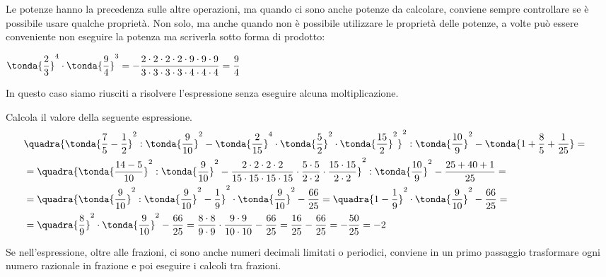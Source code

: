 Le potenze hanno la precedenza sulle altre operazioni, ma quando ci sono 
anche potenze da calcolare, conviene sempre controllare se è possibile usare 
qualche proprietà. Non solo, ma anche quando non è possibile utilizzare le 
proprietà delle potenze, a volte può essere conveniente non eseguire la 
potenza ma scriverla sotto forma di prodotto:

\begin{esempio}{}{}
\(\tonda{\dfrac{2}{3}}^4 \cdot \tonda{\dfrac{9}{4}}^3  = 
-\dfrac{2 \cdot 2 \cdot 2 \cdot 2 \cdot 9 \cdot 9 \cdot 9}
      {3 \cdot 3 \cdot 3 \cdot 3 \cdot 4 \cdot 4 \cdot 4} = \dfrac{9}{4}\)
\end{esempio}

In questo caso siamo riusciti a risolvere l'espressione senza eseguire
alcuna moltiplicazione.


\begin{esempio}{}{}
Calcola il valore della seguente espressione.
{\footnotesize
\begin{align*}
&\quadra{
  \tonda{\frac{7}{5}-\frac{1}{2}}^{2}:
  \tonda{\frac{9}{10}}^{2}-
  \tonda{\frac{2}{15}}^{4} \cdot
  \tonda{\frac{5}{2}}^2 \cdot
  \tonda{\frac{15}{2}}^{2}
}^{2}:
\tonda{\frac{10}{9}}^{2}-
\tonda{1+\frac{8}{5}+\frac{1}{25}}=&\\
&=\quadra{
  \tonda{\frac{14 - 5}{10}}^{2}:
  \tonda{\frac{9}{10}}^{2}-
  \frac{2 \cdot 2 \cdot 2 \cdot 2}{15 \cdot 15 \cdot 15 \cdot 15} \cdot
  \frac{5 \cdot 5}{2 \cdot 2} \cdot
  \frac{15 \cdot 15}{2 \cdot 2}
}^{2}:
\tonda{\frac{10}{9}}^{2}-
\frac{25 + 40 + 1}{25}=\\
&=\quadra{
  \tonda{\frac{9}{10}}^{2}:
  \tonda{\frac{9}{10}}^{2}-
  \frac{1}{9}
}^{2} \cdot
\tonda{\frac{9}{10}}^{2}-
\frac{66}{25}=
\quadra{
  1 -\frac{1}{9}
}^{2} \cdot
\tonda{\frac{9}{10}}^{2}-
\frac{66}{25}=\\
&=\quadra{\frac{8}{9}}^{2} \cdot
\tonda{\frac{9}{10}}^{2}-
\frac{66}{25}=
\frac{8\cdot8}{9 \cdot 9} \cdot
\frac{9\cdot9}{10 \cdot 10}-
\frac{66}{25} = \frac{16}{25} - \frac{66}{25} = -\frac{50}{25} = -2
\end{align*}
}
\end{esempio}

Se nell'espressione, oltre alle frazioni, ci sono anche numeri decimali 
limitati o periodici, conviene in un primo passaggio trasformare ogni 
numero razionale in frazione e poi eseguire i calcoli tra frazioni.

